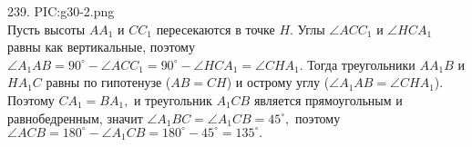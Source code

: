 239. {{PIC:g30-2.png}}\\
Пусть высоты $AA_1$ и $CC_1$ пересекаются в точке $H.$ Углы $\angle ACC_1$ и $\angle HCA_1$ равны как вертикальные, поэтому $\angle A_1AB=90^\circ-\angle ACC_1=90^\circ-\angle HCA_1=\angle CHA_1.$ Тогда треугольники $AA_1B$ и $HA_1C$ равны по гипотенузе ($AB=CH$) и острому углу ($\angle A_1AB=\angle CHA_1$). Поэтому $CA_1=BA_1,$ и треугольник $A_1CB$ является прямоугольным и равнобедренным, значит $\angle A_1BC=\angle A_1CB=45^\circ,$ поэтому $\angle ACB=180^\circ-\angle A_1CB=180^\circ-45^\circ=135^\circ.$\\
